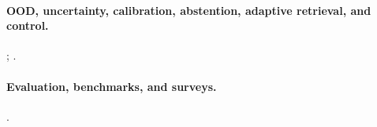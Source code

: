 \paragraph{OOD, uncertainty, calibration, abstention, adaptive retrieval, and control.} \citep{rrag006,rrag012,rrag034,rrag041,rrag064,rrag066,rrag074,rrag075,rrag087,rrag093,rrag095,rrag105,ctrla2025,rrag108,rrag111,rrag113,rrag135,rrag141}; \citep{rrag146,rrag153,rrag159,rrag164,rrag167,rrag169,rrag173,rrag178,rrag186,rrag191,rrag192,rrag193,rrag198,rrag205,rrag228}. 

\paragraph{Evaluation, benchmarks, and surveys.} \citep{trustRAGCompass2024,ragTruth2024,rrag151,ragComprehensive2025}. 
